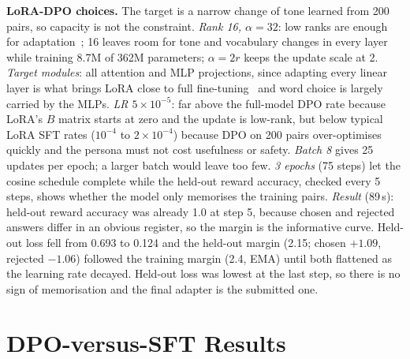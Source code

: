 \documentclass[10pt]{article}
\begin{document}
\textbf{LoRA-DPO choices.} The target is a narrow change of tone learned from 200 pairs, so capacity is not the
constraint. \emph{Rank 16, $\alpha = 32$}: low ranks are enough for adaptation~\cite{lora}; 16 leaves room for tone and
vocabulary changes in every layer while training 8.7M of 362M parameters; $\alpha = 2r$ keeps the update scale at 2.
\emph{Target modules}: all attention and MLP projections, since adapting every linear layer is what brings LoRA close
to full fine-tuning~\cite{qlora} and word choice is largely carried by the MLPs. \emph{LR $5{\times}10^{-5}$}: far
above the full-model DPO rate because LoRA's $B$ matrix starts at zero and the update is low-rank, but below typical
LoRA SFT rates ($10^{-4}$ to $2{\times}10^{-4}$) because DPO on 200 pairs over-optimises quickly and the persona
must not cost usefulness or safety. \emph{Batch 8} gives 25 updates per epoch; a larger batch would leave too few.
\emph{3 epochs} (75 steps) let the cosine schedule complete while the held-out reward accuracy, checked every 5 steps,
shows whether the model only memorises the training pairs. \emph{Result} (89\,s): held-out reward accuracy was
already 1.0 at step 5, because chosen and rejected answers differ in an obvious register, so the margin is the
informative curve. Held-out loss fell from 0.693 to 0.124 and the held-out margin (2.15; chosen $+1.09$, rejected
$-1.06$) followed the training margin (2.4, EMA) until both flattened as the learning rate decayed. Held-out loss was
lowest at the last step, so there is no sign of memorisation and the final adapter is the submitted one.

\section{DPO-versus-SFT Results}
\end{document}
